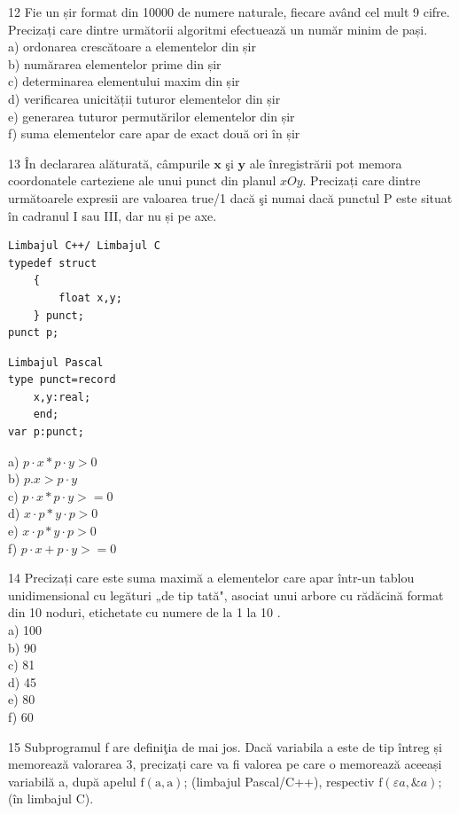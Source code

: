 \documentclass[10pt]{article}
\begin{document}
12 Fie un șir format din 10000 de numere naturale, fiecare având cel mult 9 cifre. Precizați care dintre următorii algoritmi efectuează un număr minim de pași.\\
a) ordonarea crescătoare a elementelor din șir\\
b) numărarea elementelor prime din șir\\
c) determinarea elementului maxim din șir\\
d) verificarea unicității tuturor elementelor din șir\\
e) generarea tuturor permutărilor elementelor din șir\\
f) suma elementelor care apar de exact două ori în șir

13 În declararea alăturată, câmpurile $\mathbf{x}$ şi $\mathbf{y}$ ale înregistrării pot memora coordonatele carteziene ale unui punct din planul $x O y$. Precizați care dintre următoarele expresii are valoarea true/1 dacă şi numai dacă punctul P este situat în cadranul I sau III, dar nu și pe axe.

\begin{verbatim}
Limbajul C++/ Limbajul C
typedef struct
    {
        float x,y;
    } punct;
punct p;
\end{verbatim}

\begin{verbatim}
Limbajul Pascal
type punct=record
    x,y:real;
    end;
var p:punct;
\end{verbatim}

a) $p \cdot x * p \cdot y>0$\\
b) $p . x>p \cdot y$\\
c) $p \cdot x * p \cdot y>=0$\\
d) $x \cdot p * y \cdot p>0$\\
e) $x \cdot p * y \cdot p>0$\\
f) $p \cdot x+p \cdot y>=0$

14 Precizați care este suma maximă a elementelor care apar într-un tablou unidimensional cu legături „de tip tată", asociat unui arbore cu rădăcină format din 10 noduri, etichetate cu numere de la 1 la 10 .\\
a) 100\\
b) 90\\
c) 81\\
d) 45\\
e) 80\\
f) 60

15 Subprogramul f are definiţia de mai jos. Dacă variabila a este de tip întreg și memorează valorarea 3, precizați care va fi valorea pe care o memorează aceeași variabilă a, după apelul $\mathrm{f}(\mathrm{a}, \mathrm{a})$; (limbajul Pascal/C++), respectiv $\mathrm{f}(\varepsilon a, \& a)$; (în limbajul C).
\end{document}
